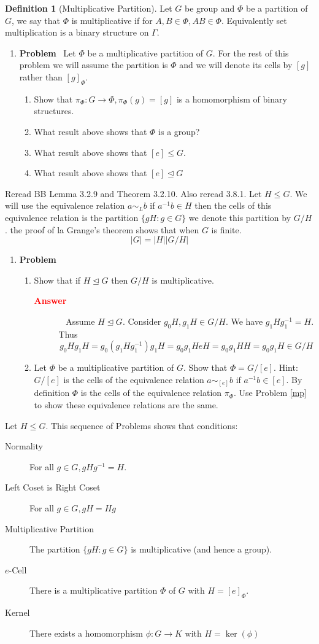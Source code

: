 \documentclass[12pt]{amsart}
\newcommand{\benu}{\begin{enumerate}}
\newcommand{\eenu}{\end{enumerate}}
\newcommand{\bed}{\begin{description}}
\newcommand{\ed}{\end{description}}
\theoremstyle{definition}
\newtheorem{definition}[theorem]{Definition}
\newcommand{\bdf}{\begin{definition}}
\newcommand{\edf}{\end{definition}}
\newcommand{\itep}{\item {\bfseries Problem}\ }
\newcommand{\beans}{\begin{description} \item[{ \bfseries \textcolor{red}{Answer}}]\ }
\newcommand{\eans }{\end{description}}
\begin{document}
\bdf[Multiplicative Partition] Let $G$ be group and $\Phi$ be a partition of $G$, we say that $\Phi$ is multiplicative if for $A,B\in \Phi,AB\in\Phi$. Equivalently set multiplication is a binary structure on $\Gamma$.
\edf
\begin{enumerate}[resume=p]
\itep \label{mp} Let $\Phi$ be a multiplicative partition of $G$. For the rest of this problem we will assume the partition is $\Phi$ and we will denote its cells by $[g]$ rather than $[g]_\Phi$. 
\benu 
 \item  Show that $\pi_\Phi\colon G\to \Phi,\pi_\Phi(g)=[g]$ is a homomorphism of binary structures.
\item What result above shows that $\Phi$ is a group?
\item What result above shows that $[e]\leq G$.
\item What result above shows that $[e]\unlhd G$
\eenu
\end{enumerate}
Reread BB Lemma 3.2.9 and Theorem 3.2.10.  Also reread  3.8.1. Let $H\leq G$. We will use the equivalence relation $a\sim_L b$ if $a^{-1}b\in H$ then the cells of this equivalence relation is the partition $\{gH:g\in G\}$ we denote this partition by $G/H$. the proof of la Grange's theorem shows that when $G$ is finite.
\[|G|=|H||G/H|\]
\begin{enumerate}[resume=p]
\itep 
\benu

 \item Show that if $H\unlhd G$ then $G/H$ is multiplicative.
\beans
Assume  $H\unlhd G$. Consider $g_0H,g_1H\in G/H$. We have $g_1Hg_1^{-1}=H$. Thus 
\[g_0Hg_1H=g_0(g_1Hg_1^{-1})g_1H=g_0g_1HeH=g_0g_1HH=g_0g_1H\in G/H
\]
\eans
\item Let $\Phi$ be a multiplicative partition of $G$. Show that $\Phi=G/[e]$. Hint: $G/[e]$ is the cells of the equivalence relation $a\sim_{[e]} b$ if $a^{-1}b\in [e]$. By definition $\Phi$ is the cells of the equivalence relation $\pi_\Phi$. Use Problem \ref{mp} to show these equivalence relations are the same.
\eenu
\end{enumerate}
Let $H\leq G$. This sequence of Problems shows that  conditions:

\bed
\item[Normality] For all $g\in G,gHg^{-1}=H$.
\item[Left Coset is Right Coset] For all $g\in G,gH=Hg$
\item[Multiplicative Partition] The partition $\{gH:g\in G\}$ is multiplicative (and hence a group).
\item[$e$-Cell] There is a multiplicative partition $\Phi$ of $G$ with $H=[e]_\Phi$.
\item[Kernel] There exists a homomorphism $\phi\colon G\to K$ with $H=\ker(\phi)$
\ed
\end{document}
